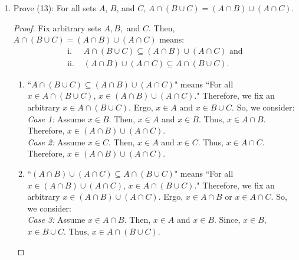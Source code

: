 \documentclass{article}
\begin{document}
\begin{enumerate}
\begin{enumerate}
    			\item Prove (13): For all sets $A$, $B$, and $C$, $A \cap (B \cup C) = (A \cap B) \cup (A \cap C)$.
                        \begin{proof}
                            Fix arbitrary sets $A, B,$ and $C$. Then, $A \cap (B \cup C) = (A \cap B) \cup (A \cap C)$ means: 
                            \begin{align*}
                                \text{i. } &A \cap (B \cup C) \subseteq (A \cap B) \cup (A \cap C) \text{ and} \\
                                \text{ii. } &(A \cap B) \cup (A \cap C) \subseteq A \cap (B \cup C).
                            \end{align*}

                            \begin{enumerate}
                                \item ``$A \cap (B \cup C) \subseteq (A \cap B) \cup (A \cap C)$" means ``For all $x \in A \cap (B \cup C)$, $x \in (A \cap B) \cup (A \cap C)$." Therefore, we fix an arbitrary $x \in A \cap (B \cup C)$. Ergo, $x \in A$ and $x \in B \cup C$. So, we consider:\\

                                    \quad\emph{Case 1:} Assume $x \in B$. Then, $x \in A$ and $x \in B$. Thus, $x \in A \cap B$. Therefore, $x \in (A \cap B) \cup (A \cap C)$. \\
    
                                    \quad\emph{Case 2:} Assume $x \in C$. Then, $x \in A$ and $x \in C$. Thus, $x \in A \cap C$. Therefore, $x \in (A \cap B) \cup (A \cap C)$. \\

                                \item ``$(A \cap B) \cup (A \cap C) \subseteq A \cap (B \cup C)$" means ``For all $x \in (A \cap B) \cup (A \cap C)$, $x \in A \cap (B \cup C)$." Therefore, we fix an arbitrary $x \in (A \cap B) \cup (A \cap C)$. Ergo, $x \in A \cap B$ or $x \in A \cap C$. So, we consider:\\

                                    \quad\emph{Case 3:} Assume $x \in A \cap B$. Then, $x \in A$ and $x \in B$. Since, $x \in B$, $x \in B \cup C$. Thus, $x \in A \cap (B \cup C)$. \\
                                    

\end{enumerate}
\end{proof}
\end{enumerate}
\end{enumerate}
\end{document}
